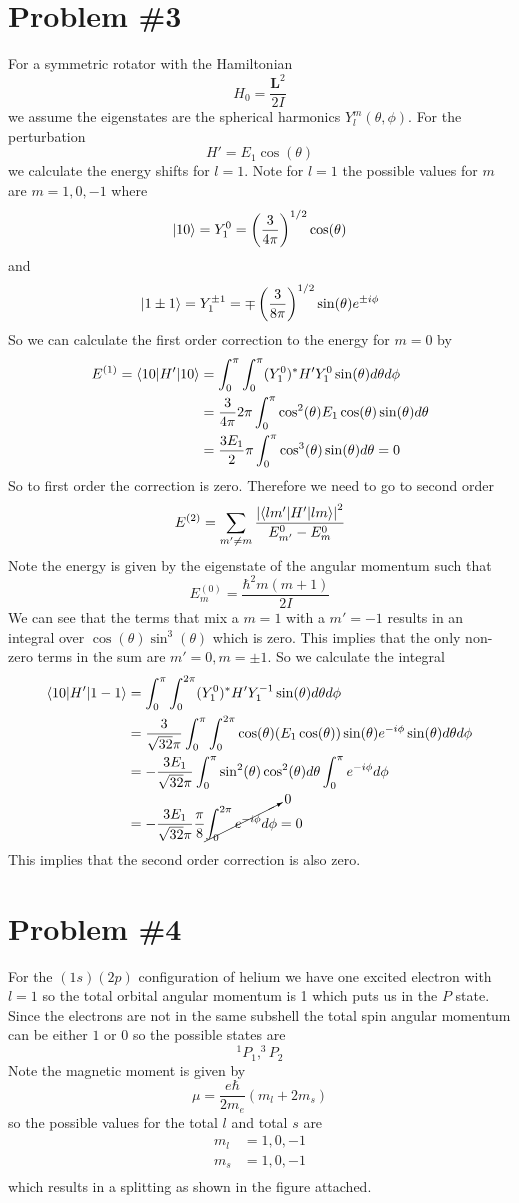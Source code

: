 \documentclass[11pt]{article}
\numberwithin{equation}{section}
\begin{document}
\section{Problem \#3}
For a symmetric rotator with the Hamiltonian
$$H_0 = \frac{\mathbf{L}^2}{2I}$$
we assume the eigenstates are the spherical harmonics $Y_l^m(\theta,\phi)$. For the perturbation
$$H' = E_1\cos(\theta)$$
we calculate the energy shifts for $l=1$. Note for $l=1$ the possible values for $m$ are $m=1,0,-1$ where
$$|{10}\rangle = Y_1^0 = \left(\frac{3}{4\pi}\right)^{1/2}\cos(\theta)$$
and
$$|{1\pm1}\rangle = Y_1^{\pm1} = \mp\left(\frac{3}{8\pi}\right)^{1/2}\sin(\theta)e^{\pm i\phi}$$
So we can calculate the first order correction to the energy for $m=0$ by
\begin{align*}
E^{(1)} = \langle{10}|H'|{10}\rangle &= \int_{0}^{\pi}\int_{0}^{\pi}(Y_1^0)^*H'Y_1^0\sin(\theta)d\theta d\phi\\
&= \frac{3}{4\pi}2\pi\int_{0}^{\pi}\cos^2(\theta)E_1\cos(\theta)\sin(\theta)d\theta\\
&= \frac{3E_1}{2}\pi\int_{0}^{\pi}\cos^3(\theta)\sin(\theta)d\theta = 0
\end{align*}
So to first order the correction is zero. Therefore we need to go to second order
$$E^{(2)} = \sum_{m'\ne m}\frac{\left|\langle{lm'}|H'|{lm}\rangle\right|^2}{E^{0}_{m'}-E^{0}_m}$$
Note the energy is given by the eigenstate of the angular momentum such that
$$E^{(0)}_{m} = \frac{\hbar^2m(m+1)}{2I}$$
We can see that the terms that mix a $m=1$ with a $m'=-1$ results in an integral over $\cos(\theta)\sin^3(\theta)$ which is zero. This implies that the only non-zero terms in the sum are $m'=0,m=\pm1$. So we calculate the integral
\begin{align*}
\langle{10}|H'|{1-1}\rangle &= \int_{0}^{\pi}\int_{0}^{2\pi}(Y_1^0)^*H'Y_1^{-1}\sin(\theta)d\theta d\phi\\
&= \frac{3}{\sqrt{32}\pi}\int_{0}^{\pi}\int_{0}^{2\pi}\cos(\theta)(E_1\cos(\theta))\sin(\theta)e^{-i\phi}\sin(\theta)d\theta d\phi\\
&= -\frac{3E_1}{\sqrt{32}\pi}\int_{0}^{\pi}\sin^2(\theta)\cos^2(\theta)d\theta\int_{0}^{\pi}e^{-i\phi}d\phi\\
&= -\frac{3E_1}{\sqrt{32}\pi}\frac{\pi}{8}\cancelto{0}{\int_{0}^{2\pi}e^{-i\phi}d\phi} = 0
\end{align*} 
This implies that the second order correction is also zero.

\section{Problem \#4}
For the $(1s)(2p)$ configuration of helium we have one excited electron with $l=1$ so the total orbital angular momentum is 1 which puts us in the $P$ state. Since the electrons are not in the same subshell the total spin angular momentum can be either $1$ or $0$ so the possible states are
$$^1P_{1},^3P_{2}$$
Note the magnetic moment is given by
$$\mu = \frac{e\hbar}{2m_e}(m_l+2m_s)$$
so the possible values for the total $l$ and total $s$ are 
\begin{align*}
m_l &= 1,0,-1\\
m_s &= 1,0,-1\\
\end{align*}
which results in a splitting as shown in the figure attached.
\end{document}
